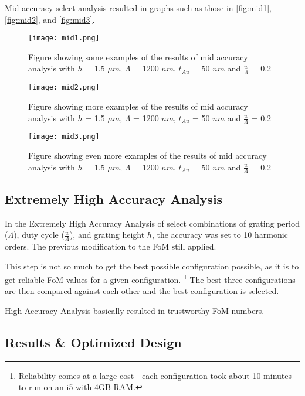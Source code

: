 Mid-accuracy select analysis resulted in graphs such as those in \autoref{fig:mid1}, \autoref{fig:mid2}, and \autoref{fig:mid3}.

\begin{figure}
\centering
\texttt{[image: mid1.png]}
\caption{Figure showing some examples of the results of mid accuracy analysis with $h$ = 1.5 $\mu m$, $\Lambda$ = 1200 $nm$, $t_{Au}$ = 50 $nm$ and $\frac{w}{\Lambda}$ = 0.2}
\label{fig:mid1}
\end{figure}

\begin{figure}
\centering
\texttt{[image: mid2.png]}
\caption{Figure showing more examples of the results of mid accuracy analysis with $h$ = 1.5 $\mu m$, $\Lambda$ = 1200 $nm$, $t_{Au}$ = 50 $nm$ and $\frac{w}{\Lambda}$ = 0.2}
\label{fig:mid2}
\end{figure}

\begin{figure}
\centering
\texttt{[image: mid3.png]}
\caption{Figure showing even more examples of the results of mid accuracy analysis with $h$ = 1.5 $\mu m$, $\Lambda$ = 1200 $nm$, $t_{Au}$ = 50 $nm$ and $\frac{w}{\Lambda}$ = 0.2}
\label{fig:mid3}
\end{figure}


\subsection{Extremely High Accuracy Analysis}

In the Extremely High Accuracy Analysis of select combinations of grating period ($\Lambda$), duty cycle ($\frac{w}{\Lambda}$), and grating height $h$, the accuracy was set to 10 harmonic orders. The previous modification to the FoM still applied.

This step is not so much to get the best possible configuration possible, as it is to get reliable FoM values for a given configuration. \footnote{Reliability comes at a large cost - each configuration took about 10 minutes to run on an i5 with 4GB RAM.} The best three configurations are then compared against each other and the best configuration is selected.

High Accuracy Analysis basically resulted in trustworthy FoM numbers. 

\subsection{Results \& Optimized Design}

